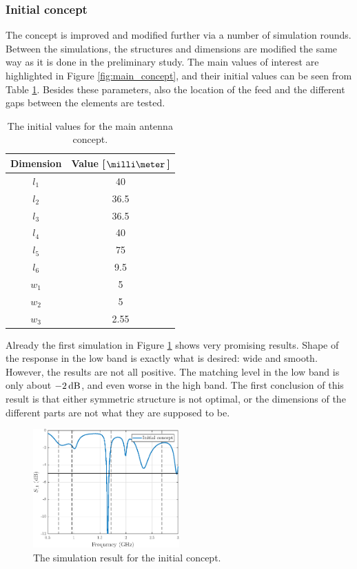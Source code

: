 \subsubsection{Initial concept}
\label{sec:initial_concept}
The concept is improved and modified further via a number of simulation rounds. Between the simulations, the structures and dimensions are modified the same way as it is done in the preliminary study. The main values of interest are highlighted in Figure \ref{fig:main_concept}, and their initial values can be seen from Table \ref{tab:initial_concept}. Besides these parameters, also the location of the feed and the different gaps between the elements are tested. 
\begin{table}[H]
    \centering
    \caption{The initial values for the main antenna concept.}
    \label{tab:initial_concept}
    \begin{tabular}{|c|c|}
        \hline
        \textbf{Dimension} & \textbf{Value [$\milli\meter$]} \\
        \hline
        $l_1$ & 40\\
        \hline
        $l_2$ & 36.5\\
        \hline
        $l_3$ & 36.5\\
        \hline
        $l_4$ & 40\\
        \hline
        $l_5$ & 75\\
        \hline
        $l_6$ & 9.5\\
        \hline
        $w_1$ & 5\\
        \hline
        $w_2$ & 5\\
        \hline
        $w_3$ & 2.55\\
        \hline
    \end{tabular}
\end{table}

Already the first simulation in Figure \ref{fig:concept_ini} shows very promising results. Shape of the response in the low band is exactly what is desired: wide and smooth. However, the results are not all positive. The matching level in the low band is only about $-2\,\mathrm{dB}$, and even worse in the high band. The first conclusion of this result is that either symmetric structure is not optimal, or the dimensions of the different parts are not what they are supposed to be.
\begin{figure}[H]
    \centering
    \includegraphics[width=0.5\textwidth]{img/concept_ini.eps}
    \caption{The simulation result for the initial concept.}
    \label{fig:concept_ini}
\end{figure}


